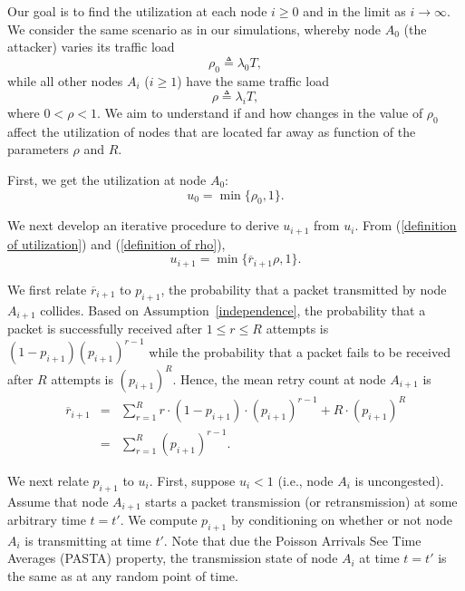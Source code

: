 \documentclass{IEEEtran}
\begin{document}
Our goal is to find the utilization at each node $i \geq 0$ and in the limit as $i \to \infty$. We consider the same scenario as in our simulations,
whereby node $A_0$ (the attacker) varies its traffic load
\begin{equation}
\rho_0 \triangleq \lambda_0 T,
\end{equation}
while all other nodes $A_i$ ($i \geq 1$) have the same traffic load
\begin{equation} \label{definition of rho}
\rho \triangleq \lambda_i T,
\end{equation}
where $0 < \rho < 1$.  We aim to understand if and how changes in the value of $\rho_0$ affect the utilization of nodes that are located far away as
function of the parameters $\rho$ and $R$.

First, we get the utilization at node $A_0$:
\begin{equation}
u_0 = \min\{\rho_0, 1\}.
\end{equation}

We next develop an iterative procedure to derive $u_{i+1}$ from $u_i$.
From (\ref{definition of utilization}) and (\ref{definition of rho}),
\begin{equation} \label{definition of utilization with rho}
u_{i+1}=\min\{ \overline{r}_{i+1} \rho, 1\}.
\end{equation}


We first relate $\overline{r}_{i+1}$ to $p_{i+1}$, the probability that a packet transmitted by node $A_{i+1}$ collides.
Based on Assumption~\ref{independence}, the probability that a packet is successfully received after $1 \leq r \leq R$ attempts is
 $(1 - p_{i+1}) (p_{i+1})^{r-1}$ while the probability that a packet  fails to be received after $R$ attempts is $(p_{i+1})^R $. 
 Hence, the
mean retry count at node $A_{i+1}$ is
\begin{eqnarray} \label{LP:average retry count without retry limit}
\overline{r}_{i+1} & = &  \sum_{r=1}^{R} r  \cdot (1 - p_{i+1}) \cdot  (p_{i+1})^{r-1} +R  \cdot (p_{i+1})^R \nonumber \\
& = & \sum_{r=1}^{R} (p_{i+1})^{r-1}.
\end{eqnarray}



We next relate  $p_{i+1}$ to $u_i$. First, suppose $u_i < 1$ (i.e., node $A_i$ is uncongested).   
Assume that node $A_{i+1}$ starts a packet transmission (or retransmission) at some arbitrary time $t=t'$. We compute $p_{i+1}$ by
conditioning on whether or not node $A_i$ is transmitting at time $t'$.  Note that due the Poisson Arrivals See Time Averages (PASTA) property, the
transmission state of node $A_i$ at time $t=t'$ is the same as at any random point of time. 
\end{document}
